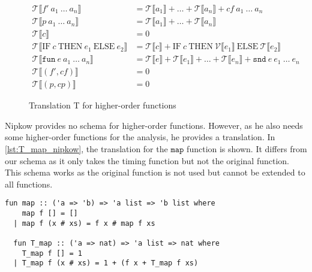 \begin{figure}
  \begin{align*}
    \mathcal{T}\llbracket f'\ a_{1}\ \dots\ a_{n}\rrbracket &= \mathcal{T}\llbracket a_{1}\rrbracket + \dots + \mathcal{T}\llbracket a_{n}\rrbracket + cf\ a_{1}\ \dots\ a_{n}\\
    \mathcal{T}\llbracket p\ a_{1}\ \dots\ a_{n}\rrbracket &= \mathcal{T}\llbracket a_{1}\rrbracket + \dots + \mathcal{T}\llbracket a_{n}\rrbracket\\
    \mathcal{T}\llbracket c \rrbracket &= 0\\
    \mathcal{T}\llbracket \text{IF}\ c\ \text{THEN}\ e_{1}\ \text{ELSE}\ e_{2}\rrbracket &= \mathcal{T}\llbracket c\rrbracket + \text{IF}\  c\ \text{THEN}\ \mathcal{V}\llbracket e_{1}\rrbracket\ \text{ELSE}\ \mathcal{T}\llbracket e_{2}\rrbracket\\
    \mathcal{T}\llbracket\texttt{fun}\ e\ a_{1}\ \dots\ a_{n}\rrbracket &= \mathcal{T}\llbracket e\rrbracket + \mathcal{T}\llbracket e_{1}\rrbracket + \dots + \mathcal{T}\llbracket e_{n}\rrbracket + \texttt{snd}\ e\ e_{1}\ \dots\ e_{n}\\
    \mathcal{T}\llbracket (f',cf)\rrbracket &= 0\\
    \mathcal{T}\llbracket (p,cp)\rrbracket &= 0
  \end{align*}
  \caption{Translation T for higher-order functions}
  \label{fig:higher_T}
\end{figure}

Nipkow provides no schema for higher-order functions.
However, as he also needs some higher-order functions for the analysis, he provides a translation.
In \autoref{lst:T_map_nipkow}, the translation for the $\texttt{map}$ function is shown.
It differs from our schema as it only takes the timing function but not the original function.
This schema works as the original function is not used but cannot be extended to all functions.
\begin{lstlisting}[language=isabelle,mathescape=true,caption=Translation of the function map to their timing function by Nipkow,label=lst:T_map_nipkow]
  fun map :: ('a => 'b) => 'a list => 'b list where
    map f [] = []
  | map f (x # xs) = f x # map f xs

  fun T_map :: ('a => nat) => 'a list => nat where
    T_map f [] = 1
  | T_map f (x # xs) = 1 + (f x + T_map f xs)
\end{lstlisting}
